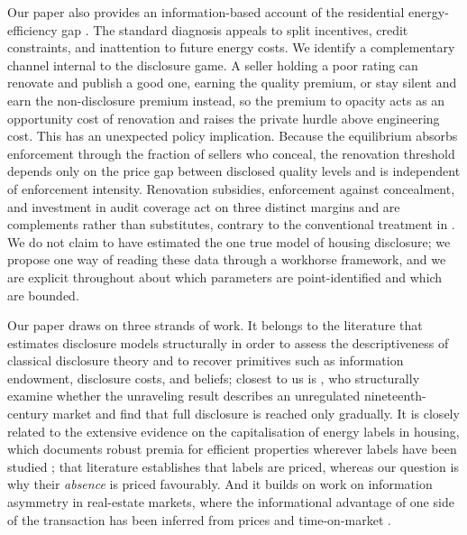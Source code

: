 Our paper also provides an information-based account of the residential energy-efficiency gap
\citep{allcott_is_2012, gerarden_assessing_2017}. The standard diagnosis appeals to split
incentives, credit constraints, and inattention to future energy costs. We identify a
complementary channel internal to the disclosure game. A seller holding a poor rating can
renovate and publish a good one, earning the quality premium, or stay silent and earn the
non-disclosure premium instead, so the premium to opacity acts as an opportunity cost of
renovation and raises the private hurdle above engineering cost. This has an unexpected policy
implication. Because the equilibrium absorbs enforcement through the fraction of sellers who
conceal, the renovation threshold depends only on the price gap between disclosed quality
levels and is independent of enforcement intensity. Renovation subsidies, enforcement against
concealment, and investment in audit coverage act on three distinct margins and are complements
rather than substitutes, contrary to the conventional treatment in
\citet{gillingham_palmer_2014}. We do not claim to have estimated the one true model of housing
disclosure; we propose one way of reading these data through a workhorse framework, and we are
explicit throughout about which parameters are point-identified and which are bounded.

Our paper draws on three strands of work. It belongs to the literature that estimates
disclosure models structurally in order to assess the descriptiveness of classical disclosure
theory and to recover primitives such as information endowment, disclosure costs, and beliefs;
closest to us is \citet{bourveau_learning_2025}, who structurally examine whether the unraveling
result describes an unregulated nineteenth-century market and find that full disclosure is
reached only gradually.
It is closely related to the extensive evidence on the capitalisation of energy labels in
housing, which documents robust premia for efficient properties wherever labels have been
studied \citep{brounen_kok_2011, hyland_lyons_2013, fuerst_energy_2016, frondel_power_2018,
myers_mandatory_2022}; that literature establishes that labels are priced, whereas our question
is why their \emph{absence} is priced favourably. And it builds on work on information
asymmetry in real-estate markets, where the informational advantage of one side of the
transaction has been inferred from prices and time-on-market \citep{levitt_syverson_2008,
lizzeri_1999}.

